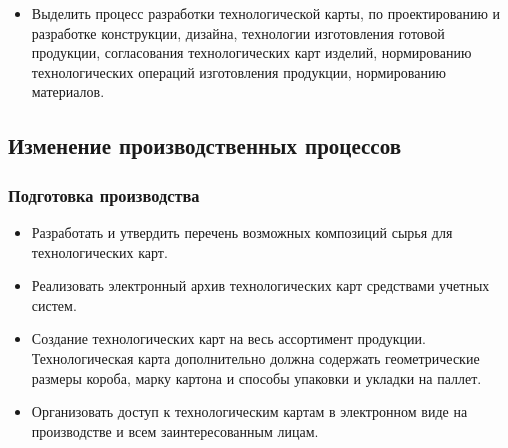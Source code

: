 
 \begin{itemize}

\item Выделить процесс разработки технологической карты, 
 по проектированию и разработке конструкции, дизайна, технологии изготовления готовой продукции, согласования технологических карт изделий, нормированию технологических операций изготовления продукции, нормированию материалов.





 \end{itemize}



\subsection{Изменение производственных процессов}

\subsubsection{Подготовка производства}

 \begin{itemize}
 \item Разработать и утвердить перечень возможных композиций сырья для технологических карт. 
 \item Реализовать электронный архив технологических карт средствами учетных систем.
\item Создание технологических карт на весь ассортимент продукции. Технологическая карта дополнительно должна содержать геометрические размеры короба, марку картона и способы упаковки и укладки на паллет.
 \item Организовать доступ к технологическим картам в электронном виде на производстве и всем заинтересованным лицам.
 \end{itemize}

